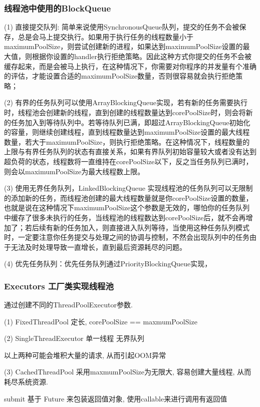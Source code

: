 \documentclass[UTF8]{ctexart}
\begin{document}
\subsubsection{线程池中使用的BlockQueue}
(1) 直接提交队列: 简单来说使用SynchronousQueue队列，提交的任务不会被保存，总是会马上提交执行。如果用于执行任务的线程数量小于maximumPoolSize，则尝试创建新的进程，如果达到maximumPoolSize设置的最大值，则根据你设置的handler执行拒绝策略。因此这种方式你提交的任务不会被缓存起来，而是会被马上执行，在这种情况下，你需要对你程序的并发量有个准确的评估，才能设置合适的maximumPoolSize数量，否则很容易就会执行拒绝策略；\par
(2) 有界的任务队列可以使用ArrayBlockingQueue实现，若有新的任务需要执行时，线程池会创建新的线程，直到创建的线程数量达到corePoolSize时，则会将新的任务加入到等待队列中。若等待队列已满，即超过ArrayBlockingQueue初始化的容量，则继续创建线程，直到线程数量达到maximumPoolSize设置的最大线程数量，若大于maximumPoolSize，则执行拒绝策略。在这种情况下，线程数量的上限与有界任务队列的状态有直接关系，如果有界队列初始容量较大或者没有达到超负荷的状态，线程数将一直维持在corePoolSize以下，反之当任务队列已满时，则会以maximumPoolSize为最大线程数上限。\par
(3) 使用无界任务队列，LinkedBlockingQueue 实现线程池的任务队列可以无限制的添加新的任务，而线程池创建的最大线程数量就是你corePoolSize设置的数量，也就是说在这种情况下maximumPoolSize这个参数是无效的，哪怕你的任务队列中缓存了很多未执行的任务，当线程池的线程数达到corePoolSize后，就不会再增加了；若后续有新的任务加入，则直接进入队列等待，当使用这种任务队列模式时，一定要注意你任务提交与处理之间的协调与控制，不然会出现队列中的任务由于无法及时处理导致一直增长，直到最后资源耗尽的问题。 \par
(4) 优先任务队列：优先任务队列通过PriorityBlockingQueue实现，
\subsubsection{Executors 工厂类实现线程池}
通过创建不同的ThreadPoolExecutor参数.\par
(1) FixedThreadPool 定长, corePoolSize == maxmumPoolSize   \par
(2) SingleThreadExecutor 单一线程 无界队列 \par
以上两种可能会堆积大量的请求, 从而引起OOM异常 \par
(3) CachedThreadPool 采用maxmumPoolSize为无限大, 容易创建大量线程, 从而耗尽系统资源. \par

submit  基于  Future 来包装返回值对象, 使用callable来进行调用有返回值
\end{document}
